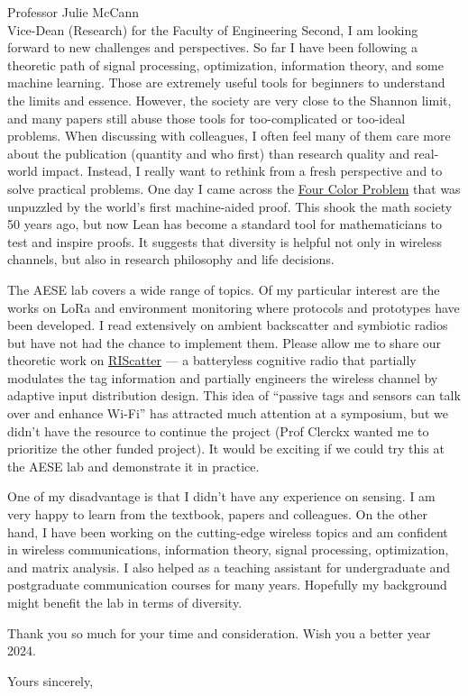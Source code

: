 \documentclass[10pt]{scrartcl}
\begin{document}
\begin{letter}{%
		Professor Julie McCann\\
		Vice-Dean (Research) for the Faculty of Engineering
	}
	Second, I am looking forward to new challenges and perspectives.
	So far I have been following a theoretic path of signal processing, optimization, information theory, and some machine learning.
	Those are extremely useful tools for beginners to understand the limits and essence.
	However, the society are very close to the Shannon limit, and many papers still abuse those tools for too-complicated or too-ideal problems.
	When discussing with colleagues, I often feel many of them care more about the publication (quantity and who first) than research quality and real-world impact.
	Instead, I really want to rethink from a fresh perspective and to solve practical problems.
	One day I came across the \href{https://en.wikipedia.org/wiki/Four_color_theorem}{Four Color Problem} that was unpuzzled by the world's first machine-aided proof.
	This shook the math society 50 years ago, but now Lean has become a standard tool for mathematicians to test and inspire proofs.
	It suggests that diversity is helpful not only in wireless channels, but also in research philosophy and life decisions.

	The AESE lab covers a wide range of topics.
	Of my particular interest are the works on LoRa and environment monitoring where protocols and prototypes have been developed.
	I read extensively on ambient backscatter and symbiotic radios but have not had the chance to implement them.
	Please allow me to share our theoretic work on \href{https://github.com/snowztail/riscatter-unifying-backscatter-communication-and-reconfigurable-intelligent-surface/blob/master/poster/beamer.pdf}{RIScatter} --- a batteryless cognitive radio that partially modulates the tag information and partially engineers the wireless channel by adaptive input distribution design.
	This idea of ``passive tags and sensors can talk over and enhance Wi-Fi'' has attracted much attention at a symposium, but we didn't have the resource to continue the project (Prof Clerckx wanted me to prioritize the other funded project).
	It would be exciting if we could try this at the AESE lab and demonstrate it in practice.

	One of my disadvantage is that I didn't have any experience on sensing.
	I am very happy to learn from the textbook, papers and colleagues.
	On the other hand, I have been working on the cutting-edge wireless topics and am confident in wireless communications, information theory, signal processing, optimization, and matrix analysis.
	I also helped as a teaching assistant for undergraduate and postgraduate communication courses for many years.
	Hopefully my background might benefit the lab in terms of diversity.

	Thank you so much for your time and consideration. Wish you a better year 2024.
	\closing{Yours sincerely,}
\end{letter}
\end{document}
